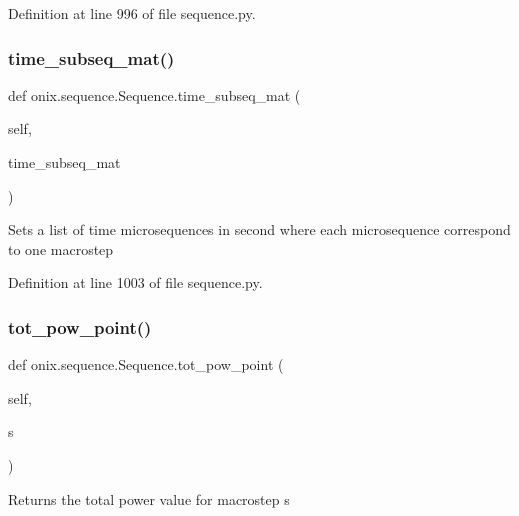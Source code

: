 Definition at line 996 of file sequence.\+py.

\mbox{\label{classonix_1_1sequence_1_1Sequence_a9e1f8750228a3af64160d1e79de4d2bc}} 
\subsubsection{\texorpdfstring{time\+\_\+subseq\+\_\+mat()}{time\_subseq\_mat()}\hspace{0.1cm}{\footnotesize\ttfamily [2/2]}}
{\footnotesize\ttfamily def onix.\+sequence.\+Sequence.\+time\+\_\+subseq\+\_\+mat (\begin{DoxyParamCaption}\item[{}]{self,  }\item[{}]{time\+\_\+subseq\+\_\+mat }\end{DoxyParamCaption})}

\begin{DoxyVerb}Sets a list of time microsequences in second where each microsequence correspond 
to one macrostep
\end{DoxyVerb}
 

Definition at line 1003 of file sequence.\+py.

\mbox{\label{classonix_1_1sequence_1_1Sequence_a9adfb234a40f3b3b09cf3bab0389f31b}} 
\subsubsection{\texorpdfstring{tot\+\_\+pow\+\_\+point()}{tot\_pow\_point()}}
{\footnotesize\ttfamily def onix.\+sequence.\+Sequence.\+tot\+\_\+pow\+\_\+point (\begin{DoxyParamCaption}\item[{}]{self,  }\item[{}]{s }\end{DoxyParamCaption})}

\begin{DoxyVerb}Returns the total power value for macrostep s
\end{DoxyVerb}
 

